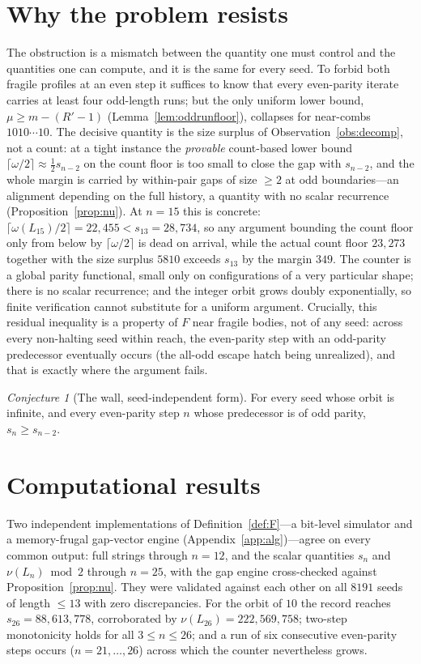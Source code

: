 \documentclass[11pt,reqno]{amsart}
\theoremstyle{plain}
\theoremstyle{definition}
\theoremstyle{remark}
\newtheorem{conjecture}{Conjecture}
\begin{document}
\section{Why the problem resists}\label{sec:wall}
The obstruction is a mismatch between the quantity one must control and the quantities one can compute, and it is the same for every seed. To forbid both fragile profiles at an even step it suffices to know that every even-parity iterate carries at least four odd-length runs; but the only uniform lower bound, $\mu\ge m-(R'-1)$ (Lemma~\ref{lem:oddrunfloor}), collapses for near-combs $1010\cdots10$. The decisive quantity is the size surplus of Observation~\ref{obs:decomp}, not a count: at a tight instance the \emph{provable} count-based lower bound $\lceil\omega/2\rceil\approx\tfrac12 s_{n-2}$ on the count floor is too small to close the gap with $s_{n-2}$, and the whole margin is carried by within-pair gaps of size $\ge 2$ at odd boundaries---an alignment depending on the full history, a quantity with no scalar recurrence (Proposition~\ref{prop:nu}). At $n=15$ this is concrete: $\lceil\omega(L_{15})/2\rceil=22{,}455<s_{13}=28{,}734$, so any argument bounding the count floor only from below by $\lceil\omega/2\rceil$ is dead on arrival, while the actual count floor $23{,}273$ together with the size surplus $5810$ exceeds $s_{13}$ by the margin $349$. The counter is a global parity functional, small only on configurations of a very particular shape; there is no scalar recurrence; and the integer orbit grows doubly exponentially, so finite verification cannot substitute for a uniform argument. Crucially, this residual inequality is a property of $F$ near fragile bodies, not of any seed: across every non-halting seed within reach, the even-parity step with an odd-parity predecessor eventually occurs (the all-odd escape hatch being unrealized), and that is exactly where the argument fails.

\begin{conjecture}[The wall, seed-independent form]\label{conj:wall}
For every seed whose orbit is infinite, and every even-parity step $n$ whose predecessor is of odd parity, $s_n\ge s_{n-2}$.
\end{conjecture}

\section{Computational results}\label{sec:comp}
Two independent implementations of Definition~\ref{def:F}---a bit-level simulator and a memory-frugal gap-vector engine (Appendix~\ref{app:alg})---agree on every common output: full strings through $n=12$, and the scalar quantities $s_n$ and $\nu(L_n)\bmod 2$ through $n=25$, with the gap engine cross-checked against Proposition~\ref{prop:nu}. They were validated against each other on all $8191$ seeds of length $\le 13$ with zero discrepancies. For the orbit of $10$ the record reaches $s_{26}=88{,}613{,}778$, corroborated by $\nu(L_{26})=222{,}569{,}758$; two-step monotonicity holds for all $3\le n\le 26$; and a run of six consecutive even-parity steps occurs ($n=21,\dots,26$) across which the counter nevertheless grows.
\end{document}
